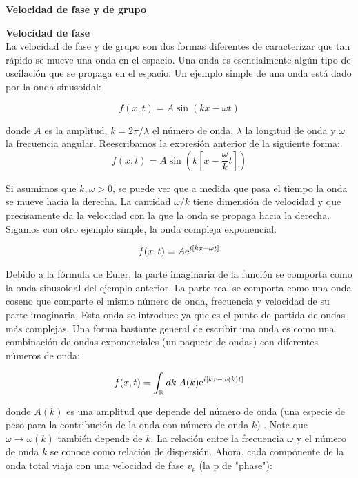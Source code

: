 \documentclass[12pt]{article}
\newcommand{\e}{{\rm e}}
\begin{document}
 
\begin{center}
\Large \textbf{Velocidad de fase y de grupo}\\
\end{center}
 

\textbf{Velocidad de fase}\\

La velocidad de fase y de grupo son dos formas diferentes de caracterizar que tan rápido se mueve una onda en el espacio. Una onda es esencialmente algún tipo de oscilación que se propaga en el espacio. Un ejemplo simple de una onda está dado por la onda sinusoidal:

\begin{equation}
f(x,t) = A \sin(kx-\omega t)
\end{equation} 

donde $A$ es la amplitud, $k =2\pi/\lambda$ el número de onda, $\lambda$ la longitud de onda y $\omega$ la frecuencia angular. Reescribamos la expresión anterior de la siguiente forma:
\begin{equation}
f(x,t) = A \sin \left( k \left[x-\frac{\omega}{k} t\right]   \right)
\end{equation} 

Si asumimos que $k,\omega>0$, se puede ver que a medida que pasa el tiempo la onda se mueve hacia la derecha. La cantidad $\omega/k$ tiene dimensión de velocidad y que precisamente da la velocidad con la que la onda se propaga hacia la derecha. Sigamos con otro ejemplo simple, la onda compleja exponencial:

\begin{equation}
f(x,t) = A \e^{i[kx-\omega t]}
\end{equation}

Debido a la fórmula de Euler, la parte imaginaria de la función se comporta como la onda sinusoidal del ejemplo anterior. La parte real se comporta como una onda coseno que comparte el mismo número de onda, frecuencia y velocidad de su parte imaginaria. Esta onda se introduce ya que es el punto de partida de ondas más complejas. Una forma bastante general de escribir una onda es como una combinación de ondas exponenciales (un paquete de ondas) con diferentes números de onda:

\begin{equation}
f(x,t) = \int_{\mathbb{R}} dk\;  A(k)\e^{i[kx-\omega(k) t]}
\end{equation}
 
donde $A(k)$ es una amplitud que depende del número de onda (una especie de peso para la contribución de la onda con número de onda $k$) . Note que $\omega \rightarrow \omega(k)$ también depende de $k$. La relación entre la frecuencia $\omega$ y el número de onda $k$ se conoce como relación de dispersión. Ahora, cada componente de la onda total viaja con una velocidad de fase $v_p$ (la p de "phase"):
\end{document}
